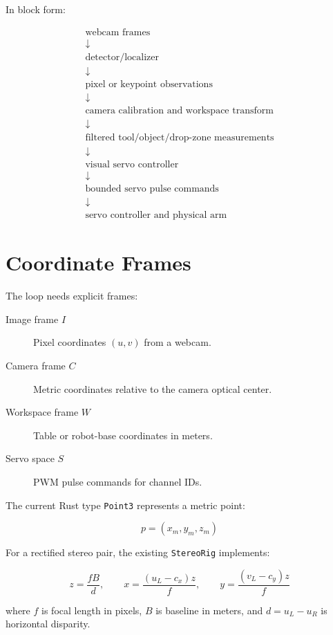 \documentclass[11pt]{article}
\begin{document}
In block form:

\[
\begin{array}{c}
\text{webcam frames}
\\ \downarrow
\\
\text{detector/localizer}
\\ \downarrow
\\
\text{pixel or keypoint observations}
\\ \downarrow
\\
\text{camera calibration and workspace transform}
\\ \downarrow
\\
\text{filtered tool/object/drop-zone measurements}
\\ \downarrow
\\
\text{visual servo controller}
\\ \downarrow
\\
\text{bounded servo pulse commands}
\\ \downarrow
\\
\text{servo controller and physical arm}
\end{array}
\]

\section{Coordinate Frames}

The loop needs explicit frames:

\begin{description}
    \item[Image frame $I$] Pixel coordinates $(u,v)$ from a webcam.
    \item[Camera frame $C$] Metric coordinates relative to the camera optical
          center.
    \item[Workspace frame $W$] Table or robot-base coordinates in meters.
    \item[Servo space $S$] PWM pulse commands for channel IDs.
\end{description}

The current Rust type \texttt{Point3} represents a metric point:

\[
    p = (x_m, y_m, z_m)
\]

For a rectified stereo pair, the existing \texttt{StereoRig} implements:

\[
    z = \frac{fB}{d}, \qquad
    x = \frac{(u_L - c_x)z}{f}, \qquad
    y = \frac{(v_L - c_y)z}{f}
\]

where $f$ is focal length in pixels, $B$ is baseline in meters, and
$d = u_L - u_R$ is horizontal disparity.
\end{document}
